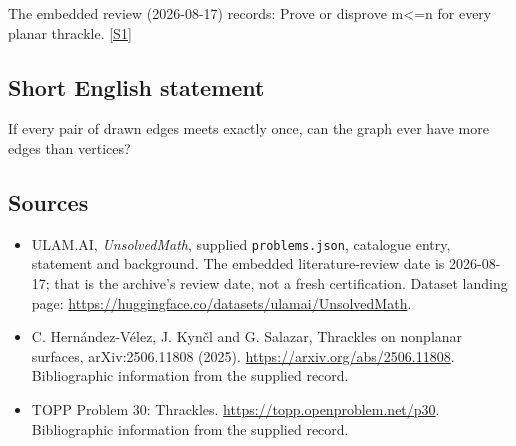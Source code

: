 \documentclass[11pt,a4paper]{article}
\newcommand{\sref}[2]{\hyperlink{source:#1:#2}{[S#2]}}
\begin{document}
The embedded review (2026-08-17) records: Prove or disprove m<=n for every planar thrackle. \sref{statement}{1}

\subsection{Short English statement}

If every pair of drawn edges meets exactly once, can the graph ever have more edges than vertices?

\subsection{Sources}

{\small

\begin{itemize}

\item[\hypertarget{source:statement:1}{S1}] ULAM.AI, \emph{UnsolvedMath}, supplied \texttt{problems.json}, catalogue entry, statement and background. The embedded literature-review date is 2026-08-17; that is the archive’s review date, not a fresh certification. Dataset landing page: \url{https://huggingface.co/datasets/ulamai/UnsolvedMath}.

\item[\hypertarget{source:statement:2}{S2}] C. Hernández-Vélez, J. Kynčl and G. Salazar, Thrackles on nonplanar surfaces, arXiv:2506.11808 (2025). \url{https://arxiv.org/abs/2506.11808}. Bibliographic information from the supplied record.

\item[\hypertarget{source:statement:3}{S3}] TOPP Problem 30: Thrackles. \url{https://topp.openproblem.net/p30}. Bibliographic information from the supplied record.

\end{itemize}

}

\label{end:statement}
\end{document}

